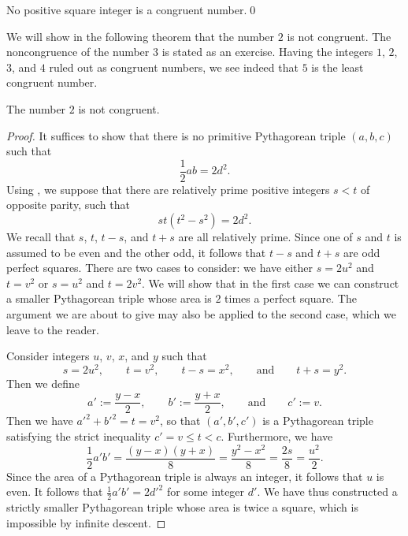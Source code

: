 \begin{theorem}\label{theorem:not-congruent-square}
  No positive square integer is a congruent number.\qed
\end{theorem}

We will show in the following theorem that the number $2$ is not congruent. The noncongruence of the number $3$ is stated as an exercise. Having the integers $1$, $2$, $3$, and $4$ ruled out as congruent numbers, we see indeed that $5$ is the least congruent number.

\begin{theorem}\label{theorem:not-congruent-twice-square}
  The number $2$ is not congruent.
\end{theorem}

\begin{proof}
  It suffices to show that there is no primitive Pythagorean triple $(a,b,c)$ such that
  \begin{equation*}
    \frac{1}{2}ab=2d^2.
  \end{equation*}
  Using , we suppose that there are relatively prime positive integers $s<t$ of opposite parity, such that
  \begin{equation*}
    st(t^2-s^2)=2d^2.
  \end{equation*}
  We recall that $s$, $t$, $t-s$, and $t+s$ are all relatively prime. Since one of $s$ and $t$ is assumed to be even and the other odd, it follows that $t-s$ and $t+s$ are odd perfect squares. There are two cases to consider: we have either $s=2u^2$ and $t=v^2$ or $s=u^2$ and $t=2v^2$. We will show that in the first case we can construct a smaller Pythagorean triple whose area is $2$ times a perfect square. The argument we are about to give may also be applied to the second case, which we leave to the reader.

  Consider integers $u$, $v$, $x$, and $y$ such that
  \begin{equation*}
    s=2u^2,\qquad t=v^2,\qquad t-s=x^2,\qquad\text{and}\qquad t+s=y^2.
  \end{equation*}
  Then we define
  \begin{equation*}
    a':=\frac{y-x}{2},\qquad b':=\frac{y+x}{2},\qquad\text{and}\qquad c':= v.
  \end{equation*}
  Then we have $a'^2+b'^2=t=v^2$, so that $(a',b',c')$ is a Pythagorean triple satisfying the strict inequality $c'=v\leq t<c$. Furthermore, we have
  \begin{equation*}
    \frac{1}{2}a'b'=\frac{(y-x)(y+x)}{8}=\frac{y^2-x^2}{8}=\frac{2s}{8}=\frac{u^2}{2}.
  \end{equation*}
  Since the area of a Pythagorean triple is always an integer, it follows that $u$ is even. It follows that $\frac{1}{2}a'b'=2d'^2$ for some integer $d'$. We have thus constructed a strictly smaller Pythagorean triple whose area is twice a square, which is impossible by infinite descent.
\end{proof}


